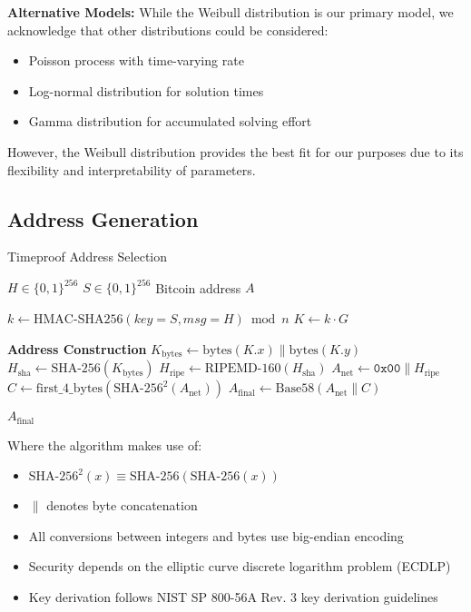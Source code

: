 \documentclass[12pt]{report}
\begin{document}
\textbf{Alternative Models:}
While the Weibull distribution is our primary model, we acknowledge that other distributions could be considered:
\begin{itemize}
    \item Poisson process with time-varying rate
    \item Log-normal distribution for solution times
    \item Gamma distribution for accumulated solving effort
\end{itemize}
However, the Weibull distribution provides the best fit for our purposes due to its flexibility and interpretability of parameters.

\subsection{Address Generation}

\begin{algorithm}
\caption{Timeproof Address Selection}
\label{alg:address}
\begin{algorithmic}[1]
    \Require $H \in \{0,1\}^{256}$ 
    \Require $S \in \{0,1\}^{256}$ 
    \Ensure Bitcoin address $A$
    
    \State $k \gets \text{HMAC-SHA256}(key=S, msg=H) \bmod n$ 
    \State $K \gets k \cdot G$ 
    
    \State \textbf{Address Construction}
    \State $K_{\text{bytes}} \gets \text{bytes}(K.x) \parallel \text{bytes}(K.y)$
    \State $H_{\text{sha}} \gets \text{SHA-256}(K_{\text{bytes}})$
    \State $H_{\text{ripe}} \gets \text{RIPEMD-160}(H_{\text{sha}})$
    \State $A_{\text{net}} \gets \mathtt{0x00} \parallel H_{\text{ripe}}$
    \State $C \gets \text{first\_4\_bytes}(\text{SHA-256}^2(A_{\text{net}}))$
    \State $A_{\text{final}} \gets \text{Base58}(A_{\text{net}} \parallel C)$
    
    \State \Return $A_{\text{final}}$
\EndProcedure
\end{algorithmic}
\end{algorithm}

Where the algorithm makes use of:
\begin{itemize}
    \item $\text{SHA-256}^2(x) \equiv \text{SHA-256}(\text{SHA-256}(x))$
    \item $\parallel$ denotes byte concatenation
    \item All conversions between integers and bytes use big-endian encoding
    \item Security depends on the elliptic curve discrete logarithm problem (ECDLP) \cite{BlakeSeroussiSmart1999}
    \item Key derivation follows NIST SP 800-56A Rev. 3 key derivation guidelines
\end{itemize}
\end{document}
